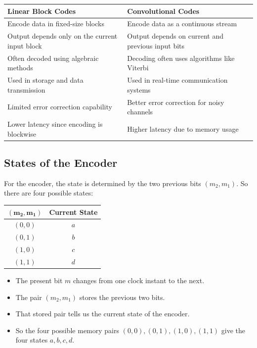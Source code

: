 \documentclass[11pt,a4paper]{book}
\renewcommand{\arraystretch}{1.4}
\newenvironment{infobox}[1][Information]{%
    \begin{tcolorbox}[
        enhanced,
        breakable,
        colback=mintgreen!10,
        colframe=mintgreen!200,
        title=#1,
        fonttitle=\bfseries,
        sharp corners,
        boxrule=0.8pt,
        left=8pt,
        right=8pt,
        top=6pt,
        bottom=6pt
    ]
}{\end{tcolorbox}}
\begin{document}
\begin{center}
\renewcommand{\arraystretch}{1.8}
\setlength{\tabcolsep}{8pt}
\begin{tabular}{|L{8.5cm}|L{8.5cm}|}
\hline
\textbf{Linear Block Codes} & \textbf{Convolutional Codes} \\
\hline
Encode data in fixed-size blocks & Encode data as a continuous stream \\
\hline
Output depends only on the current input block & Output depends on current and previous input bits \\
\hline
Often decoded using algebraic methods & Decoding often uses algorithms like Viterbi \\
\hline
Used in storage and data transmission & Used in real-time communication systems \\
\hline
Limited error correction capability & Better error correction for noisy channels \\
\hline
Lower latency since encoding is blockwise & Higher latency due to memory usage \\
\hline
\end{tabular}
\end{center}

\subsection{States of the Encoder}

For the encoder, the state is determined by the two previous bits \((m_2,m_1)\). So there are four possible states:

\begin{center}
\renewcommand{\arraystretch}{1.2}
\setlength{\tabcolsep}{8pt}
\begin{tabular}{|c|c|}
\hline
\(\boldsymbol{(m_2,m_1)}\) & \textbf{Current State} \\
\hline
\((0,0)\) & \(a\) \\
\hline
\((0,1)\) & \(b\) \\
\hline
\((1,0)\) & \(c\) \\
\hline
\((1,1)\) & \(d\) \\
\hline
\end{tabular}
\end{center}

\begin{infobox}[Simple Reading]
\begin{itemize}
    \item The present bit \(m\) changes from one clock instant to the next.
    \item The pair \((m_2,m_1)\) stores the previous two bits.
    \item That stored pair tells us the current state of the encoder.
    \item So the four possible memory pairs \((0,0),(0,1),(1,0),(1,1)\) give the four states \(a,b,c,d\).
\end{itemize}
\end{infobox}
\end{document}
